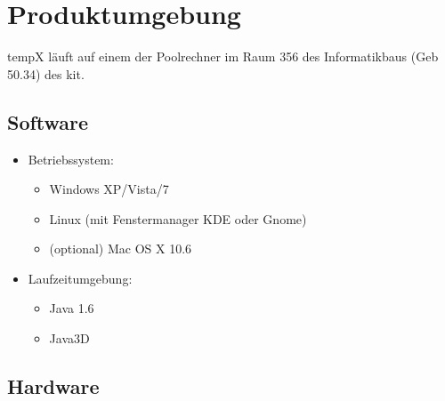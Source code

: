 \section{Produktumgebung}

\label{sec:produktumgebung}

\gls{tempX} läuft auf einem der Poolrechner im Raum 356 des Informatikbaus (Geb 50.34) des \gls{kit}.

\subsection{Software}

	\begin{itemize}
		
		\item Betriebssystem: 
		\begin{itemize}
			\item Windows XP/Vista/7
			\item Linux (mit Fenstermanager KDE oder Gnome)
			\item (optional) Mac OS X 10.6
		\end{itemize}
	
		\item Laufzeitumgebung:
		\begin{itemize}
			\item Java 1.6
			\item Java3D
		\end{itemize}
		
	\end{itemize}
	
\subsection{Hardware}

